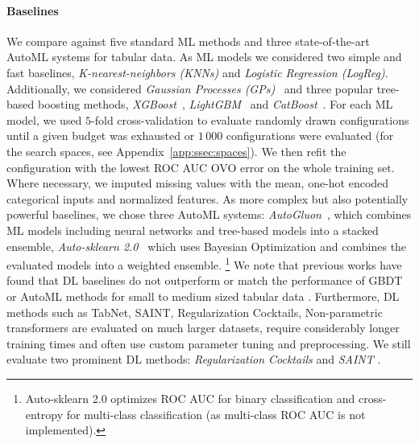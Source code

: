 \documentclass{article}
\begin{document}
\paragraph{Baselines} We compare against five standard ML methods and three state-of-the-art AutoML systems for tabular data.
As ML models we considered two simple and fast baselines, \textit{K-nearest-neighbors (KNNs)} and \textit{Logistic Regression (LogReg)}. Additionally, we considered \textit{Gaussian Processes (GPs)}~\citep{rasmussen-book06a} and three popular tree-based boosting methods, \textit{XGBoost}~\citep{chen-arxiv20a}, \textit{LightGBM}~\citep{NIPS2017_6449f44a} and \textit{CatBoost}~\citep{prokhorenkova-neurips18a}.
For each ML model, we used $5$-fold cross-validation to evaluate randomly drawn configurations until a given budget was exhausted or $1\,000$ configurations were evaluated (for the search spaces, see Appendix~\ref{app:ssec:spaces}).
We then refit the configuration with the lowest ROC AUC OVO error on the whole training set. Where necessary, we imputed missing values with the mean, one-hot encoded categorical inputs and normalized features.
As more complex but also potentially powerful baselines, we chose three AutoML systems: \textit{AutoGluon}~\citep{erickson-arxiv20a}, which combines ML models including neural networks and tree-based models into a stacked ensemble, \textit{Auto-sklearn 2.0}~\citep{feurer-nips15a,feurer-arxiv20v2} which uses Bayesian Optimization and combines the evaluated models into a weighted ensemble. %
\footnote{Auto-sklearn 2.0 optimizes ROC AUC for binary classification and cross-entropy for multi-class classification (as multi-class ROC AUC is not implemented).
}
We note that previous works have found that DL baselines do not outperform or match the performance of GBDT or AutoML methods for small to medium sized tabular data \citep{nnsfortabular,grinsztajn2022why,nnsfortabular2}. Furthermore, DL methods such as TabNet, SAINT, Regularization Cocktails, Non-parametric transformers \citep{arik2021tabnet, somepalli2021saint, regcocktail, kossen2021self} are evaluated on much larger datasets, require considerably longer training times and often use custom parameter tuning and preprocessing. We still evaluate two prominent DL methods: \textit{Regularization Cocktails} and \textit{SAINT} \citep{somepalli2021saint, regcocktail}.
%
\end{document}
